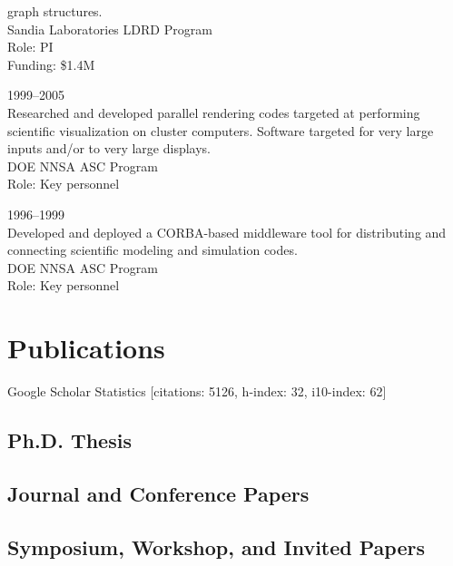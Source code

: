 \documentclass{article}
\begin{document}
\begin{description}
  graph structures.\\
  Sandia Laboratories LDRD Program\\
  Role: PI\\
  Funding: \$1.4M
\item[Scalable Rendering]\hfill 1999--2005 \\
  Researched and developed parallel rendering codes targeted at performing scientific visualization on cluster computers.  Software targeted for very large inputs and/or to very large displays.\\
  DOE NNSA ASC Program\\
  Role: Key personnel
\item[Product Realization Environment]\hfill 1996--1999 \\
  Developed and deployed a CORBA-based middleware tool for distributing
  and connecting scientific modeling and simulation codes.\\
  DOE NNSA ASC Program\\
  Role: Key personnel
\end{description}


\section*{Publications}

Google Scholar Statistics [citations: 5126, h-index: 32, i10-index: 62]

\subsection*{Ph.D. Thesis}


\subsection*{Journal and Conference Papers}


\subsection*{Symposium, Workshop, and Invited Papers}

\end{document}
